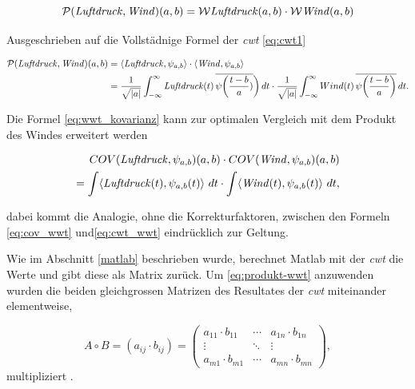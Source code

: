 \begin{refsection}
\begin{equation}
\mathcal{P}(\text{\textit{Luftdruck}},\text{\textit{Wind}})(a,b) = \mathcal{W}\text{\textit{Luftdruck}}(a,b) \cdot \mathcal{W}\text{\textit{Wind}}(a,b)
\label{eq:produkt-wwt}
\end{equation}

Ausgeschrieben auf die Vollstädnige Formel der \textit{cwt} \eqref{eq:cwt1}

\begin{equation}
\begin{split}
\mathcal{P}(\text{\textit{Luftdruck}},\text{\textit{Wind}})(a,b)
& =
\langle \text{\textit{Luftdruck}},\psi_{a,b}\rangle \cdot \langle \text{\textit{Wind}},\psi_{a,b} \rangle \\
& = \frac{1}{\sqrt{|a|}}\int_{-\infty}^\infty \text{\textit{Luftdruck}}(t)\,\overline{
	\psi\biggl(\frac{t-b}{a})}\biggr)\,dt
\cdot
\frac{1}{\sqrt{|a|}}\int_{-\infty}^\infty Wind(t)\,\overline{
	\psi\biggl(\frac{t-b}{a}\biggr)}\,dt .
\label{eq:cwt_wwt}
\end{split}
\end{equation}

Die Formel \eqref{eq:wwt_kovarianz} kann zur optimalen Vergleich mit dem Produkt des Windes erweitert werden

\begin{equation}
\begin{split}
COV(\text{\textit{Luftdruck}}, \psi_{a,b})(a,b)\cdot COV(\text{\textit{Wind}}, \psi_{a,b})(a,b) \\ =  \int \langle \text{\textit{Luftdruck}}(t),\psi_{a,b}(t)\rangle \text{\space}dt \cdot \int \langle \text{\textit{Wind}}(t),\psi_{a,b}(t)\rangle \text{\space}dt,
\label{eq:cov_wwt}
\end{split}
\end{equation}

dabei kommt die Analogie, ohne die Korrekturfaktoren, zwischen den Formeln \eqref{eq:cov_wwt} und\eqref{eq:cwt_wwt} eindrücklich zur Geltung.



Wie im Abschnitt \ref{matlab} beschrieben wurde, berechnet Matlab mit der \textit{cwt} die Werte und gibt diese als Matrix zurück.
Um \eqref{eq:produkt-wwt} anzuwenden wurden die beiden gleichgrossen Matrizen des Resultates der \textit{cwt} miteinander elementweise,

\begin{equation}
	A\circ B=(a_{{ij}}\cdot b_{{ij}})={\begin{pmatrix}a_{{11}}\cdot b_{{11}}&\cdots &a_{{1n}}\cdot b_{{1n}}\\\vdots &\ddots &\vdots \\a_{{m1}}\cdot b_{{m1}}&\cdots &a_{{mn}}\cdot b_{{mn}}\end{pmatrix}},
\end{equation}
multipliziert \cite{online:schur}.


\end{refsection}
